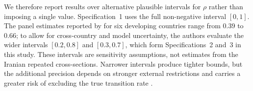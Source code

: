 \documentclass[12pt,a4paper]{article}
\begin{document}
We therefore report results over alternative plausible intervals for $\rho$ rather than imposing a single value. Specification~1 uses the full non-negative interval $[0,1]$. The panel estimates reported by \citet{dang2014using} for six developing countries range from 0.39 to 0.66; to allow for cross-country and model uncertainty, the authors evaluate the wider intervals $[0.2,0.8]$ and $[0.3,0.7]$, which form Specifications~2 and~3 in this study. These intervals are sensitivity assumptions, not estimates from the Iranian repeated cross-sections. Narrower intervals produce tighter bounds, but the additional precision depends on stronger external restrictions and carries a greater risk of excluding the true transition rate \citep[pp.~119--121]{dang2014using}.


\end{document}
